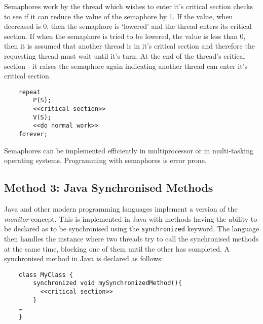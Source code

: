 Semaphores work by the thread which wishes to enter it's critical section checks to see if it can reduce the value of the semaphore by 1. If the value, when decreased is 0, then the semaphore is `lowered' and the thread enters its critical section. If when the semaphore is tried to be lowered, the value is less than 0, then it is assumed that another thread is in it's critical section and therefore the requesting thread must wait until it's turn. At the end of the thread's critical section - it raises the semaphore again indicating another thread can enter it's critical section.
\begin{verbatim}
    repeat
        P(S);
        <<critical section>>
        V(S);
        <<do normal work>>
    forever;
\end{verbatim}
Semaphores can be implemented efficiently in multiprocessor or in multi-tasking operating systems. Programming with semaphores is error prone. 

\subsection{Method 3: Java Synchronised Methods}
Java and other modern programming languages implement a version of the \textit{monitor} concept. This is implemented in Java with methods having the ability to be declared as to be synchronised using the \verb|synchronized| keyword. The language then handles the instance where two threads try to call the synchronised methods at the same time, blocking one of them until the other has completed. A synchronised method in Java is declared as follows:
\begin{verbatim}
    class MyClass {
        synchronized void mySynchronizedMethod(){
	      <<critical section>>
        }
    …
    }

\end{verbatim}

